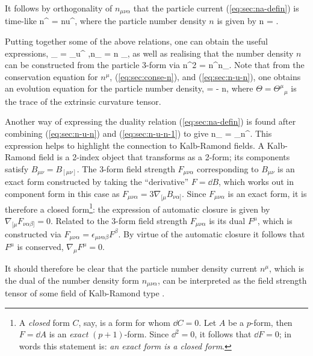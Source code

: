 It follows by orthogonality of $n_{\mu\nu\alpha}$ that the particle current (\ref{eq:sec:na-defin}) is time-like
\bea
\label{eq:sec:n-u-n}
n^{\mu} = nu^{\mu},
\eea
where the particle number density $n$ is given by
\bea
n = .
\eea

Putting together some of the above relations, one can obtain the useful expressions,
\bse
\bea
\label{eq:sec:n-u-n-1}
\epsilon_{\mu\nu\alpha} = \epsilon_{\mu\nu\alpha\beta}u^{\beta} ,\qquad n_{\mu\nu\alpha} = n \epsilon_{\mu\nu\alpha},
\eea
as well as realising that the number density $n$ can be constructed from the particle 3-form via
\bea
n^2 = n^{\mu\nu\alpha}n_{\mu\nu\alpha}.
\eea
\ese
Note that from the conservation equation for $n^{\mu}$, (\ref{eq:sec:conse-n}), and (\ref{eq:sec:n-u-n}), one obtains an evolution equation for the particle number density,
\bea
\label{ev_n}
 = - n\Theta,
\eea
where $\Theta = {\Theta^{\mu}}_{\mu}$ is the trace of the extrinsic curvature tensor.
 
Another way  of expressing the duality relation (\ref{eq:sec:na-defin}) is found after combining (\ref{eq:sec:n-u-n}) and (\ref{eq:sec:n-u-n-1}) to give
\bea
\label{eq:sec:nabc_dual_na}
n_{\mu\nu\alpha} = \epsilon_{\mu\nu\alpha\beta}n^{\beta}.
\eea
This expression helps to  highlight the connection to Kalb-Ramond fields. A Kalb-Ramond field is a 2-index object that transforms as a 2-form; its components satisfy $B_{\mu\nu} = B_{[\mu\nu]}$.
The  3-form field strength $F_{\mu\nu\alpha}$ corresponding  to $B_{\mu\nu}$ is an exact form constructed by taking the ``derivative'' $F = \dd B$, which works out in component form in this case as $F_{\mu\nu\alpha} = 3\nabla_{[\mu}B_{\nu\alpha]}$.
Since $F_{\mu\nu\alpha}$ is an exact form, it is therefore a closed form\footnote{A \textit{closed} form $C$, say, is a form for whom $\dd C=0$. Let $A$ be a $p$-form, then $F = \dd A$ is an \textit{exact} $(p+1)$-form. Since $\dd^2=0$, it follows that $\dd F=0$; in words this statement is: \textit{an exact form is a closed form}.}: the expression of  automatic closure is given by  $\nabla_{[\mu}F_{\nu\alpha\beta]}=0$. Related to the 3-form field strength $F_{\mu\nu\alpha}$  is  its dual $ {F}^{\mu}$, which is constructed via $F_{\mu\nu\alpha} = \epsilon_{\mu\nu\alpha\beta} {F}^{\beta}$. By virtue of the automatic closure  it follows that $ {F}^{\mu}$ is conserved, $\nabla_{\mu} {F}^{\mu}=0$.

It should therefore be clear that the particle number density current $n^{\mu}$, which is the dual of the number density form $n_{\mu\nu\alpha}$, can be interpreted as the field strength tensor of some field of Kalb-Ramond type \cite{Carter:1994rv}. 

